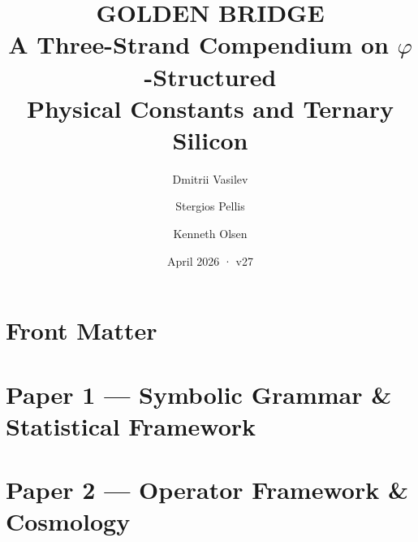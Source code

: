\documentclass[11pt,a4paper]{book}
\title{\textbf{GOLDEN BRIDGE} \\[0.5em]
\large A Three-Strand Compendium on $\varphi$-Structured \\
Physical Constants and Ternary Silicon}
\author{Dmitrii Vasilev \and Stergios Pellis \and Kenneth Olsen}
\date{April 2026 · v27}
\begin{document}
\maketitle
\tableofcontents

\part*{Front Matter}













\part{Paper 1 --- Symbolic Grammar \& Statistical Framework}




















\part{Paper 2 --- Operator Framework \& Cosmology}














\end{document}
